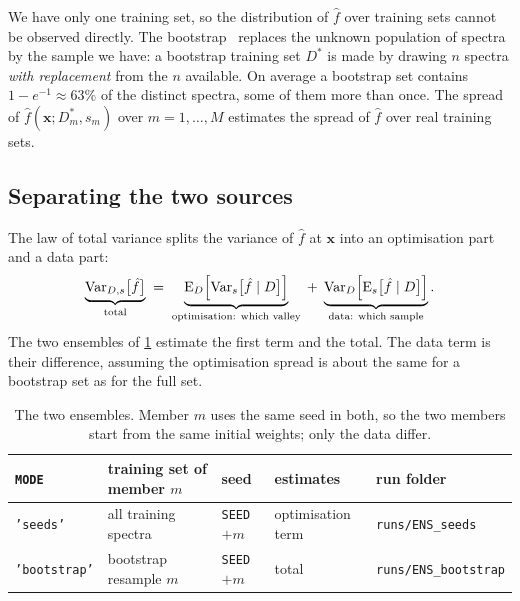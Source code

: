 \documentclass[11pt]{article}
\newcommand{\file}[1]{\nolinkurl{#1}}
\newcommand{\code}[1]{\texttt{#1}}
\newcommand{\bx}{\boldsymbol{x}}
\begin{document}
\begin{aside}
We have only one training set, so the distribution of $\hat f$ over training sets cannot
be observed directly. The bootstrap~\cite{efron1993} replaces the unknown population of
spectra by the sample we have: a bootstrap training set $D^*$ is made by drawing $n$
spectra \emph{with replacement} from the $n$ available. On average a bootstrap set
contains $1 - e^{-1} \approx 63\%$ of the distinct spectra, some of them more than once.
The spread of $\hat f(\bx; D^*_m, s_m)$ over $m = 1, \ldots, M$ estimates the spread of
$\hat f$ over real training sets.
\end{aside}

\subsection{Separating the two sources}
\label{sec:decomp}

The law of total variance splits the variance of $\hat f$ at $\bx$ into an optimisation
part and a data part:
\begin{equation}
  \underbrace{\operatorname{Var}_{D,s}\bigl[\hat f\bigr]}_{\text{total}}
  \;=\;
  \underbrace{\operatorname{E}_{D}\Bigl[\operatorname{Var}_{s}\bigl[\hat f \mid D\bigr]\Bigr]}_{\text{optimisation: which valley}}
  \;+\;
  \underbrace{\operatorname{Var}_{D}\Bigl[\operatorname{E}_{s}\bigl[\hat f \mid D\bigr]\Bigr]}_{\text{data: which sample}} .
  \label{eq:totvar}
\end{equation}
The two ensembles of \cref{tab:ensembles} estimate the first term and the total. The data
term is their difference, assuming the optimisation spread is about the same for a
bootstrap set as for the full set.

\begin{table}[h]
\centering\small
\begin{tabular}{lllll}
\toprule
\code{MODE} & training set of member $m$ & seed & estimates & run folder\\
\midrule
\code{'seeds'} & all training spectra & \code{SEED} $+ m$ & optimisation term & \file{runs/ENS_seeds}\\
\code{'bootstrap'} & bootstrap resample $m$ & \code{SEED} $+ m$ & total & \file{runs/ENS_bootstrap}\\
\bottomrule
\end{tabular}
\caption{The two ensembles. Member $m$ uses the same seed in both, so the two members
start from the same initial weights; only the data differ.}
\label{tab:ensembles}
\end{table}
\end{document}
